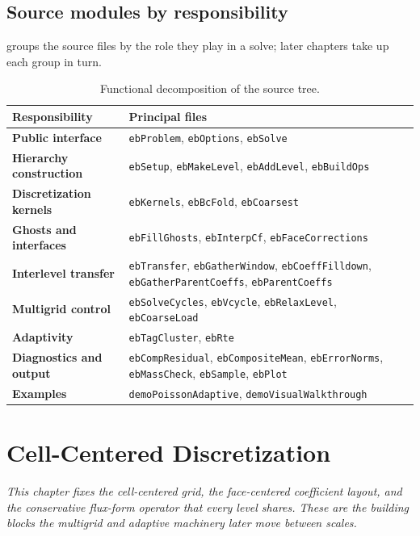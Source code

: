\documentclass[11pt,oneside,openany]{book}
\newcommand{\code}[1]{\textnormal{\texttt{#1}}}
\begin{document}
\section{Source modules by responsibility}
 groups the source files by the role they play in a solve; later chapters take up each group in turn.
\begin{table}[htbp]
\centering
\small
\begin{tabularx}{\textwidth}{@{}>{\bfseries}p{}X@{}}
\toprule
Responsibility & Principal files \\
\midrule
Public interface & \code{ebProblem}, \code{ebOptions}, \code{ebSolve} \\
Hierarchy construction & \code{ebSetup}, \code{ebMakeLevel}, \code{ebAddLevel}, \code{ebBuildOps} \\
Discretization kernels & \code{ebKernels}, \code{ebBcFold}, \code{ebCoarsest} \\
Ghosts and interfaces & \code{ebFillGhosts}, \code{ebInterpCf}, \code{ebFaceCorrections} \\
Interlevel transfer & \code{ebTransfer}, \code{ebGatherWindow}, \code{ebCoeffFilldown}, \code{ebGatherParentCoeffs}, \code{ebParentCoeffs} \\
Multigrid control & \code{ebSolveCycles}, \code{ebVcycle}, \code{ebRelaxLevel}, \code{ebCoarseLoad} \\
Adaptivity & \code{ebTagCluster}, \code{ebRte} \\
Diagnostics and output & \code{ebCompResidual}, \code{ebCompositeMean}, \code{ebErrorNorms}, \code{ebMassCheck}, \code{ebSample}, \code{ebPlot} \\
Examples & \code{demoPoissonAdaptive}, \code{demoVisualWalkthrough} \\
\bottomrule
\end{tabularx}
\caption{Functional decomposition of the source tree.}
\label{tab:modules}
\end{table}

\chapter{Cell-Centered Discretization}
\label{chap:discretization}

\emph{This chapter fixes the cell-centered grid, the face-centered coefficient layout, and the conservative flux-form operator that every level shares. These are the building blocks the multigrid and adaptive machinery later move between scales.}
\end{document}
